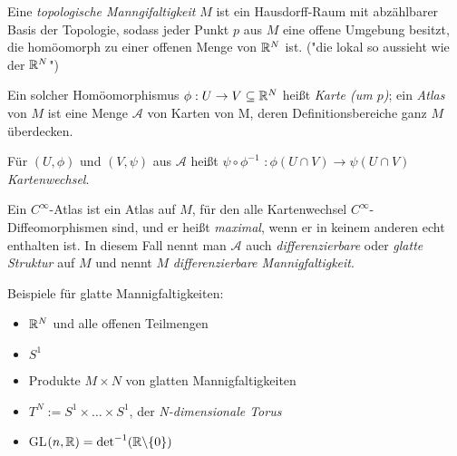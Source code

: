 \begin{defi}
Eine \emph{topologische Manngifaltigkeit} $M$ ist ein Hausdorff-Raum mit abzählbarer Basis der Topologie, sodass jeder Punkt $p$ aus $M$ eine offene Umgebung besitzt, die homöomorph zu einer offenen Menge von $\mathbb R^N$ ist. ("die lokal so aussieht wie der $\mathbb R^N$")
\end{defi}

\begin{defi}
Ein solcher Homöomorphismus $\phi: U \to V \subseteq \mathbb R^N$ heißt \emph{Karte (um $p$)}; ein \emph{Atlas} von $M$ ist eine Menge $\mathcal{A}$ von Karten von M, deren Definitionsbereiche ganz $M$ überdecken.
\end{defi}

\begin{defi}[Kartenwechsel]
Für $(U, \phi)$ und $(V, \psi)$ aus $\mathcal{A}$ heißt \underline{$\psi \circ \phi^{-1}$} $: \phi(U \cap V) \to \psi(U \cap V)$ \emph{Kartenwechsel}.
\end{defi}

\begin{defi}
Ein $C^{\infty}$-Atlas ist ein Atlas auf $M$, für den alle Kartenwechsel $C^{\infty}$-Diffeomorphismen sind, und er heißt \emph{maximal}, wenn er in keinem anderen echt enthalten ist.
In diesem Fall nennt man $\mathcal{A}$ auch \emph{differenzierbare} oder \emph{glatte Struktur} auf $M$ und nennt $M$ \emph{differenzierbare Mannigfaltigkeit}.
\end{defi}

\begin{bsp} Beispiele für glatte Mannigfaltigkeiten:
\begin{itemize}
	\item $\mathbb R^N$ und alle offenen Teilmengen
	\item $S^1$
	\item Produkte $M \times N$ von glatten Mannigfaltigkeiten
	\item $T^N := S^1 \times \dots \times S^1$, der \emph{N-dimensionale Torus}
	\item GL$(n, \mathbb R) = \det^{-1}(\mathbb R \backslash \{0\})$
\end{itemize}	
\end{bsp}
